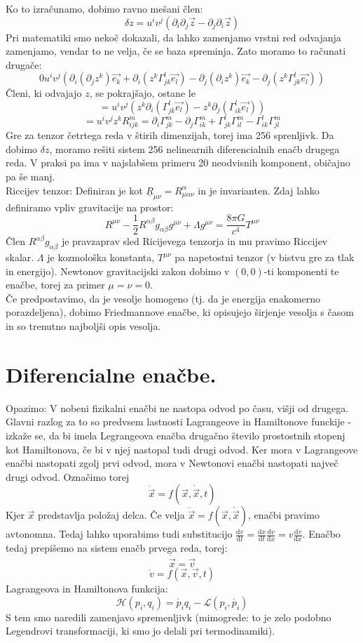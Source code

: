 \documentclass[a4paper]{article}
\newcommand{\vct}[1]{\overrightarrow{#1}}
\newcommand{\dd}[2]{\frac{\mathrm{d} {#1}}{\mathrm{d} {#2}}}
\begin{document}
Ko to izračunamo, dobimo ravno mešani člen:
$$\delta z = u^iv^j\left(\partial_i\partial_j\vct{z} - \partial_j\partial_i\vct{z}\right)$$
Pri matematiki smo nekoč dokazali, da lahko zamenjamo vrstni red odvajanja zamenjamo, vendar to ne velja, če se baza spreminja. Zato moramo to računati drugače:
$$0 u^iv^j\left(\partial_i(\partial_jz^k)\vct{e_k} + \partial_i\left(z^k\Gamma^l_{jk} \vct{e_l}\right) - \partial_j(\partial_iz^k)\vct{e_k} - \partial_j\left(z^k\Gamma^l_{jk}\vct{e_l}\right)\right)$$
Členi, ki odvajajo $z$, se pokrajšajo, ostane le $$= u^iv^j \left(z^k\partial_i(\Gamma_{jk}^l\vct{e_l}) - z^k\partial_j(\Gamma^l_{ik}\vct{e_l})\right)$$
$$= u^iv^jz^kR^{m}_{ijk} = \partial_i\Gamma_{jk}^m - \partial_j\Gamma^m_{ik} + \Gamma^l_{jk}\Gamma^m_{il} - \Gamma^l_{ik}\Gamma^m_{jl}$$
Gre za tenzor četrtega reda v štirih dimenzijah, torej ima 256 sprenljivk. Da dobimo $\delta z$, moramo rešiti sistem 256 nelinearnih diferencialnih enačb drugega reda. V praksi pa ima v najslabšem primeru 20 neodvisnih komponent, običajno pa še manj. \\[3mm]
Riccijev tenzor: Definiran je kot $\underline{R}_{\mu\nu} = R^\alpha_{\mu\alpha\nu}$ in je invarianten. Zdaj lahko definiramo vpliv gravitacije na prostor:
$$R^{\mu\nu} - \frac{1}{2}R^{\alpha\beta}g_{\alpha\beta}g^{\mu\nu} + \Lambda g^{\mu\nu} = \frac{8 \pi G}{c^4}T^{\mu\nu}$$
Člen $R^{\alpha\beta}g_{\alpha\beta}$ je pravzaprav sled Ricijevega tenzorja in mu pravimo Riccijev skalar. $\Lambda$ je kozmološka konstanta, $T^{\mu\nu}$ pa napetostni tenzor (v bistvu gre za tlak in energijo).
Newtonov gravitacijski zakon dobimo v $(0, 0)$-ti komponenti te enačbe, torej za primer $\mu = \nu = 0$. \\
Če predpostavimo, da je vesolje homogeno (tj. da je energija enakomerno porazdeljena), dobimo Friedmannove enačbe, ki opisujejo širjenje vesolja s časom in so trenutno najboljši opis vesolja.
\section{Diferencialne enačbe.} Opazimo: V nobeni fizikalni enačbi ne nastopa odvod po času, višji od drugega. Glavni razlog za to so predvsem lastnosti Lagrangeove in Hamiltonove funckije - izkaže se, da bi imela Legrangeova enačba drugačno število prostostnih stopenj kot Hamiltonova, če bi v njej nastopal tudi drugi odvod. Ker mora v Lagrangeove enačbi nastopati zgolj prvi odvod, mora v Newtonovi enačbi nastopati največ drugi odvod. Označimo torej
$$\ddot{\vct{x}} = f(\vct{x}, \dot{\vct{x}}, t)$$
Kjer $\vct{x}$ predstavlja položaj delca. Če velja $\ddot{\vct{x}} = f(\vct{x}, \dot{\vct{x}})$, enačbi pravimo avtonomna. Tedaj lahko uporabimo tudi substitucijo $\displaystyle{\dd{v}{t} = \dd{x}{t}\dd{v}{x} = v\dd{v}{x}}$. Enačbo tedaj prepišemo na sistem enačb prvega reda, torej:
$$\dot{\vct{x}} = \vct{v}$$
$$\dot{v} = f(\vct{x}, \vct{v}, t)$$
Lagrangeova in Hamiltonova funkcija: $$\mathcal{H}(p_i, q_i) = \dot{p_i}q_i - \mathcal{L}(p_i, \dot{p_i})$$
S tem smo naredili zamenjavo spremenljivk (mimogrede: to je zelo podobno Legendrovi transformaciji, ki smo jo delali pri termodinamiki). \\[3mm]
\end{document}
